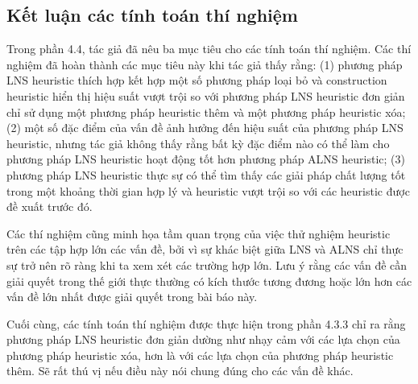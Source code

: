 \subsection{Kết luận các tính toán thí nghiệm}
Trong phần 4.4, tác giả đã nêu ba mục tiêu cho các tính toán thí nghiệm. Các thí nghiệm đã hoàn thành các mục tiêu này khi tác giả thấy rằng: (1) phương pháp LNS heuristic thích hợp kết hợp một số phương pháp loại bỏ và construction heuristic hiển thị hiệu suất vượt trội so với phương pháp LNS heuristic đơn giản chỉ sử dụng một phương pháp heuristic thêm và một phương pháp heuristic xóa; (2) một số đặc điểm của vấn đề ảnh hưởng đến hiệu suất của phương pháp LNS heuristic, nhưng tác giả không thấy rằng bất kỳ đặc điểm nào có thể làm cho phương pháp LNS heuristic hoạt động tốt hơn phương pháp ALNS heuristic; (3) phương pháp LNS heuristic thực sự có thể tìm thấy các giải pháp chất lượng tốt trong một khoảng thời gian hợp lý và heuristic vượt trội so với các heuristic được đề xuất trước đó.

Các thí nghiệm cũng minh họa tầm quan trọng của việc thử nghiệm heuristic trên các tập hợp lớn các vấn đề, bởi vì sự khác biệt giữa LNS và ALNS chỉ thực sự trở nên rõ ràng khi ta xem xét các trường hợp lớn. Lưu ý rằng các vấn đề cần giải quyết trong thế giới thực thường có kích thước tương đương hoặc lớn hơn các vấn đề lớn nhất được giải quyết trong bài báo này.

Cuối cùng, các tính toán thí nghiệm được thực hiện trong phần 4.3.3 chỉ ra rằng phương pháp LNS heuristic đơn giản dường như nhạy cảm với các lựa chọn của phương pháp heuristic xóa, hơn là với các lựa chọn của phương pháp heuristic thêm. Sẽ rất thú vị nếu điều này nói chung đúng cho các vấn đề khác.


